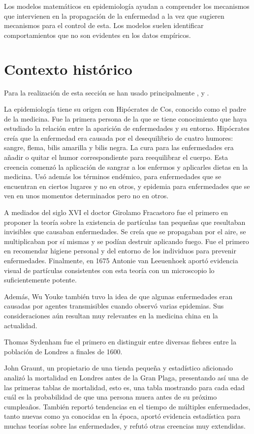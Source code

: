 Los modelos matemáticos en epidemiología ayudan a comprender los mecanismos que intervienen en la propagación de la enfermedad a la vez que sugieren mecanismos para el control de esta. Los modelos suelen identificar comportamientos que no son evidentes en los datos empíricos.


\section{Contexto histórico}

Para la realización de esta sección se han usado principalmente \cite{Byrne2012-ej}, \cite{Merril2010-nm} y \cite{Johnson2011-di}.

La epidemiología tiene su origen con Hipócrates de Cos, conocido como el padre de la medicina. Fue la primera persona de la que se tiene conocimiento que haya estudiado la relación entre la aparición de enfermedades y su entorno. Hipócrates creía que la enfermedad era causada por el desequilibrio de cuatro humores: sangre, flema, bilis amarilla y bilis negra. La cura para las enfermedades era añadir o quitar el humor correspondiente para reequilibrar el cuerpo. Esta creencia comenzó la aplicación de sangrar a los enfermos y aplicarles dietas en la medicina. Usó además los términos endémico, para enfermedades que se encuentran en ciertos lugares y no en otros, y epidemia para enfermedades que se ven en unos momentos determinados pero no en otros.

A mediados del siglo XVI el doctor Girolamo Fracastoro fue el primero en proponer la teoría sobre la existencia de partículas tan pequeñas que resultaban invisibles que causaban enfermedades. Se creía que se propagaban por el aire, se multiplicaban por sí mismas y se podían destruir aplicando fuego. Fue el primero en recomendar higiene personal y del entorno de los individuos para prevenir enfermedades. Finalmente, en 1675 Antonie van Leeuenhoek aportó evidencia visual de partículas consistentes con esta teoría con un microscopio lo suficientemente potente.

Además, Wu Youke también tuvo la idea de que algunas enfermedades eran causadas por agentes transmisibles cuando observó varias epidemias. Sus consideraciones aún resultan muy relevantes en la medicina china en la actualidad.

Thomas Sydenham fue el primero en distinguir entre diversas fiebres entre la población de Londres a finales de 1600.

John Graunt, un propietario de una tienda pequeña y estadístico aficionado analizó la mortalidad en Londres antes de la Gran Plaga, presentando así una de las primeras tablas de mortalidad, esto es, una tabla mostrando para cada edad cuál es la probabilidad de que una persona muera antes de su próximo cumpleaños. También reportó tendencias en el tiempo de múltiples enfermedades, tanto nuevas como ya conocidas en la época, aportó evidencia estadística para muchas teorías sobre las enfermedades, y refutó otras creencias muy extendidas.

